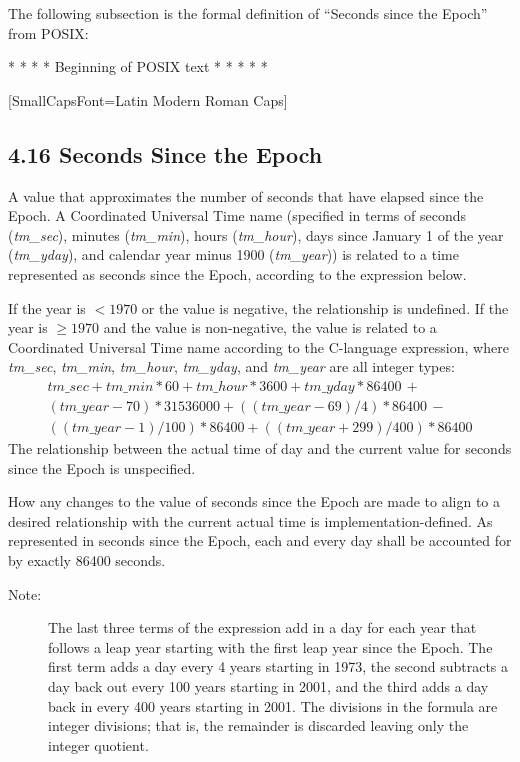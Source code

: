 \documentclass[letterpaper,twoside]{article}
\begin{document}
The following subsection is the formal definition of ``Seconds
since the Epoch'' from POSIX:

\begin{center}
  {\large * * * * * Beginning of POSIX text * * * * *}
\end{center}

{\setmainfont{Old Standard}[SmallCapsFont={Latin Modern Roman Caps}]
  \rmfamily
  
  \subsection*{4.16 Seconds Since the Epoch}
  A value that approximates the number
  of seconds that have elapsed
  since the Epoch. A Coordinated Universal Time name
  (specified in terms of seconds ({\itshape tm\_sec}),
  minutes ({\itshape tm\_min}),
  hours ({\itshape tm\_hour}), days since January 1 of the year
  ({\itshape tm\_yday}),
  and calendar year minus 1900 ({\itshape tm\_year})) is related to a time
  represented as seconds since the Epoch, according to the expression below.

  If the year is $< 1970$ or the value is negative, the relationship is
  undefined.
  If the year is $\geq 1970$ and the value is non-negative, the value is
  related to a Coordinated Universal Time name according to the
  C-language expression, where {\itshape tm\_sec}, {\itshape tm\_min},
  {\itshape tm\_hour},
  {\itshape tm\_yday}, and {\itshape tm\_year} are all integer types:
  \begin{multline*}
    tm\_sec + tm\_min*60 + tm\_hour*3600 + tm\_yday*86400 \,+ \\
    (tm\_year-70)*31536000 + ((tm\_year-69)/4)*86400 \,- \\
    ((tm\_year-1)/100)*86400 + ((tm\_year+299)/400)*86400
  \end{multline*}
  The relationship between the actual time of day and the current value
  for seconds since the Epoch is unspecified.

  How any changes to the value of seconds since the Epoch are made
  to align to a desired relationship with the current actual time
  is implementation-defined. As represented in seconds since the Epoch,
  each and every day shall be accounted for by exactly \num{86400} seconds.
  
  \begin{description}
  \item[Note:]
    The last three terms of the expression add in a day for each year
    that follows a leap year starting with the first leap year since
    the Epoch. The first term adds a day every 4 years starting in 1973,
    the second subtracts a day back out every 100 years starting in 2001,
    and the third adds a day back in every 400 years starting in 2001.
    The divisions in the formula are integer divisions; that is, the
    remainder is discarded leaving only the integer quotient.
  \end{description}

}
\end{document}
